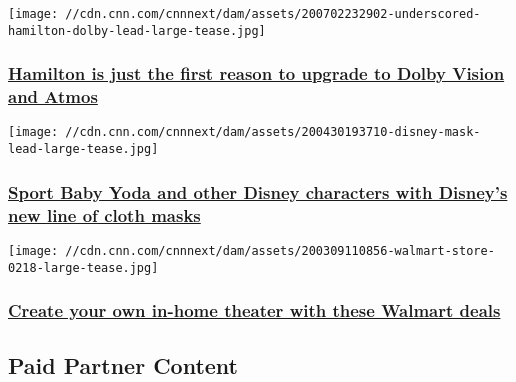 \href{/2020/07/03/cnn-underscored/hamilton-dolby-vision-atmos-watching-guide/index.html}{}

\texttt{[image: //cdn.cnn.com/cnnnext/dam/assets/200702232902-underscored-hamilton-dolby-lead-large-tease.jpg]}

\hypertarget{hamilton-is-just-the-first-reason-to-upgrade-to-dolby-vision-and-atmos}{%
\subsubsection{\texorpdfstring{\href{/2020/07/03/cnn-underscored/hamilton-dolby-vision-atmos-watching-guide/index.html}{Hamilton
is just the first reason to upgrade to Dolby Vision and
Atmos}}{Hamilton is just the first reason to upgrade to Dolby Vision and Atmos}}\label{hamilton-is-just-the-first-reason-to-upgrade-to-dolby-vision-and-atmos}}

\href{/2020/05/06/cnn-underscored/disney-face-mask-outbrain/index.html}{}

\texttt{[image: //cdn.cnn.com/cnnnext/dam/assets/200430193710-disney-mask-lead-large-tease.jpg]}

\hypertarget{sport-baby-yoda-and-other-disney-characters-with-disneys-new-line-of-cloth-masks}{%
\subsubsection{\texorpdfstring{\href{/2020/05/06/cnn-underscored/disney-face-mask-outbrain/index.html}{Sport
Baby Yoda and other Disney characters with Disney's new line of cloth
masks}}{Sport Baby Yoda and other Disney characters with Disney's new line of cloth masks}}\label{sport-baby-yoda-and-other-disney-characters-with-disneys-new-line-of-cloth-masks}}

\href{https://coupons.cnn.com/walmart}{}

\texttt{[image: //cdn.cnn.com/cnnnext/dam/assets/200309110856-walmart-store-0218-large-tease.jpg]}

\hypertarget{create-your-own-in-home-theater-with-these-walmart-deals}{%
\subsubsection{\texorpdfstring{\href{https://coupons.cnn.com/walmart}{Create
your own in-home theater with these Walmart
deals}}{Create your own in-home theater with these Walmart deals}}\label{create-your-own-in-home-theater-with-these-walmart-deals}}

\hypertarget{paid-partner-content-}{%
\subsection{Paid Partner Content~}\label{paid-partner-content-}}


